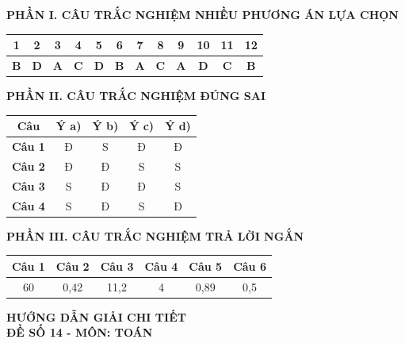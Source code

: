 \documentclass[12pt,a4paper]{article}
\begin{document}
\noindent\textbf{\large PHẦN I. CÂU TRẮC NGHIỆM NHIỀU PHƯƠNG ÁN LỰA CHỌN}
\begin{center}
\renewcommand{\arraystretch}{1.25}
\begin{tabular}{|c|c|c|c|c|c|c|c|c|c|c|c|}
\hline
\textbf{1} & \textbf{2} & \textbf{3} & \textbf{4} & \textbf{5} & \textbf{6} & \textbf{7} & \textbf{8} & \textbf{9} & \textbf{10} & \textbf{11} & \textbf{12} \\ \hline
\textbf{B} & \textbf{D} & \textbf{A} & \textbf{C} & \textbf{D} & \textbf{B} & \textbf{A} & \textbf{C} & \textbf{A} & \textbf{D} & \textbf{C} & \textbf{B} \\ \hline
\end{tabular}
\end{center}

\vspace{0.3cm}
\noindent\textbf{\large PHẦN II. CÂU TRẮC NGHIỆM ĐÚNG SAI}
\begin{center}
\renewcommand{\arraystretch}{1.25}
\begin{tabular}{|c|c|c|c|c|}
\hline
\textbf{Câu} & \textbf{Ý a)} & \textbf{Ý b)} & \textbf{Ý c)} & \textbf{Ý d)} \\ \hline
\textbf{Câu 1} & Đ & S & Đ & Đ \\ \hline
\textbf{Câu 2} & Đ & Đ & S & S \\ \hline
\textbf{Câu 3} & S & Đ & Đ & S \\ \hline
\textbf{Câu 4} & S & Đ & S & Đ \\ \hline
\end{tabular}
\end{center}

\vspace{0.3cm}
\noindent\textbf{\large PHẦN III. CÂU TRẮC NGHIỆM TRẢ LỜI NGẮN}
\begin{center}
\renewcommand{\arraystretch}{1.25}
\begin{tabular}{|c|c|c|c|c|c|}
\hline
\textbf{Câu 1} & \textbf{Câu 2} & \textbf{Câu 3} & \textbf{Câu 4} & \textbf{Câu 5} & \textbf{Câu 6} \\ \hline
60 & 0,42 & 11,2 & 4 & 0,89 & 0,5 \\ \hline
\end{tabular}
\end{center}

\newpage
\begin{center}
    {\Large\textbf{HƯỚNG DẪN GIẢI CHI TIẾT}}\\[4pt]
    \textbf{ĐỀ SỐ 14 - MÔN: TOÁN}
\end{center}
\vspace{0.3cm}
\end{document}
